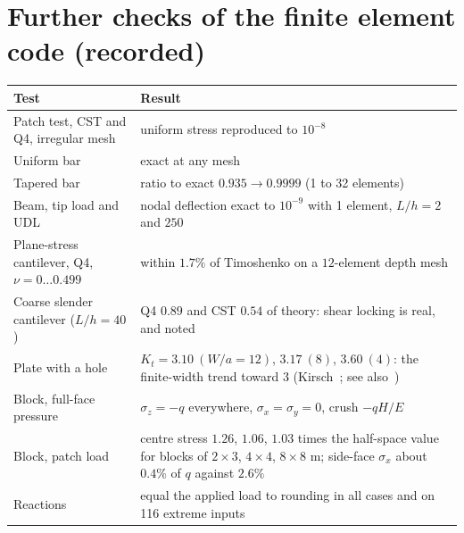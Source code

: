 \section{Further checks of the finite element code (recorded)}
\begin{center}\small
\begin{tabular}{@{}p{5.8cm}p{9.2cm}@{}}\toprule
Test & Result\\\midrule
Patch test, CST and Q4, irregular mesh & uniform stress reproduced to $10^{-8}$\\
Uniform bar & exact at any mesh\\
Tapered bar & ratio to exact $0.935\to0.9999$ (1 to 32 elements)\\
Beam, tip load and UDL & nodal deflection exact to $10^{-9}$ with 1 element, $L/h=2$ and $250$\\
Plane-stress cantilever, Q4, $\nu=0\ldots0.499$ & within $1.7\%$ of Timoshenko on a $12$-element depth mesh\\
Coarse slender cantilever ($L/h=40$) & Q4 $0.89$ and CST $0.54$ of theory: shear locking is real, and noted\\
Plate with a hole & $K_t=3.10\ (W/a=12)$, $3.17\ (8)$, $3.60\ (4)$: the finite-width trend toward $3$ (Kirsch~\cite{kirsch}; see also~\cite{peterson})\\
Block, full-face pressure & $\sigma_z=-q$ everywhere, $\sigma_x=\sigma_y=0$, crush $-qH/E$\\
Block, patch load & centre stress $1.26$, $1.06$, $1.03$ times the half-space value for blocks of $2\times3$, $4\times4$, $8\times8$ m; side-face $\sigma_x$ about $0.4\%$ of $q$ against $2.6\%$\\
Reactions & equal the applied load to rounding in all cases and on 116 extreme inputs\\\bottomrule
\end{tabular}
\end{center}

